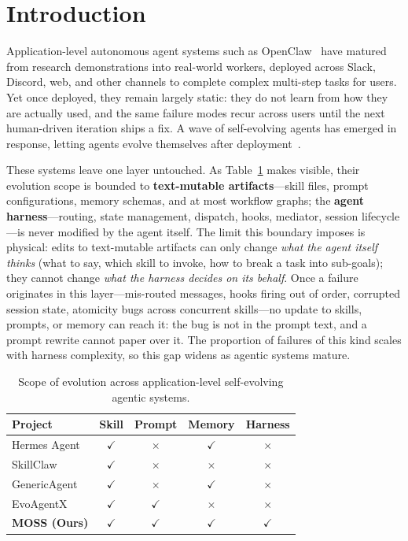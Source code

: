 \section{Introduction}
\label{sec:intro}

Application-level autonomous agent systems such as OpenClaw~\citep{openclaw-github} have matured from research demonstrations into real-world workers, deployed across Slack, Discord, web, and other channels to complete complex multi-step tasks for users. Yet once deployed, they remain largely static: they do not learn from how they are actually used, and the same failure modes recur across users until the next human-driven iteration ships a fix. A wave of self-evolving agents has emerged in response, letting agents evolve themselves after deployment~\citep{hermes-github, hermes-self-evo, wang2026procedural, ma2026skillclaw, liang2026genericagent, wang2025evoagentx}.

These systems leave one layer untouched. As Table~\ref{tab:scope-comparison} makes visible, their evolution scope is bounded to \textbf{text-mutable artifacts}---skill files, prompt configurations, memory schemas, and at most workflow graphs; the \textbf{agent harness}---routing, state management, dispatch, hooks, mediator, session lifecycle---is never modified by the agent itself. The limit this boundary imposes is physical: edits to text-mutable artifacts can only change \emph{what the agent itself thinks} (what to say, which skill to invoke, how to break a task into sub-goals); they cannot change \emph{what the harness decides on its behalf}. Once a failure originates in this layer---mis-routed messages, hooks firing out of order, corrupted session state, atomicity bugs across concurrent skills---no update to skills, prompts, or memory can reach it: the bug is not in the prompt text, and a prompt rewrite cannot paper over it. The proportion of failures of this kind scales with harness complexity, so this gap widens as agentic systems mature.

\begin{table}[ht]
\caption{Scope of evolution across application-level self-evolving agentic systems.}
\label{tab:scope-comparison}
\centering
\small
\begin{tabular}{lcccc}
\toprule
Project & Skill & Prompt & Memory & Harness \\
\midrule
Hermes Agent~\citep{hermes-github}     & $\checkmark$ & $\times$              & $\checkmark$ & $\times$ \\
SkillClaw~\citep{ma2026skillclaw}            & $\checkmark$ & $\times$              & $\times$     & $\times$ \\
GenericAgent~\citep{liang2026genericagent}             & $\checkmark$ & $\times$              & $\checkmark$ & $\times$ \\
EvoAgentX~\citep{wang2025evoagentx}                 & $\checkmark$ & $\checkmark$          & $\times$     & $\times$ \\
\textbf{MOSS (Ours)}                             & \boldmath$\checkmark$ & \boldmath$\checkmark$ & \boldmath$\checkmark$ & \boldmath$\checkmark$ \\
\bottomrule
\end{tabular}
\end{table}


